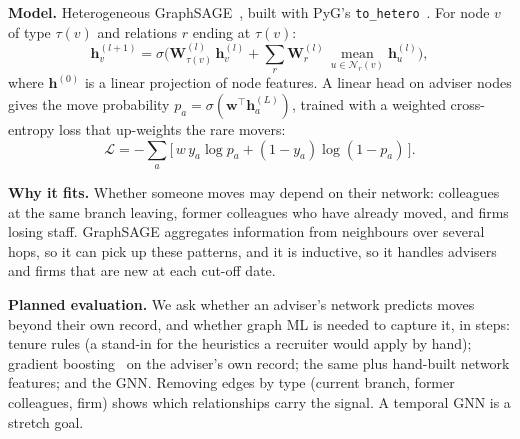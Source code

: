 \documentclass{article}
\begin{document}
\textbf{Model.} Heterogeneous GraphSAGE~\citep{hamilton2017graphsage}, built with PyG's \texttt{to\_hetero}~\citep{fey2019pyg}. For node $v$ of type $\tau(v)$ and relations $r$ ending at $\tau(v)$:
\begin{equation}
  \mathbf{h}_v^{(l+1)} = \sigma\Big( \mathbf{W}^{(l)}_{\tau(v)}\,\mathbf{h}_v^{(l)} + \sum_{r} \mathbf{W}^{(l)}_{r}\, \operatorname*{mean}_{u \in \mathcal{N}_r(v)} \mathbf{h}_u^{(l)} \Big),
\end{equation}
where $\mathbf{h}^{(0)}$ is a linear projection of node features. A linear head on adviser nodes gives the move probability $p_a = \sigma(\mathbf{w}^{\top}\mathbf{h}_a^{(L)})$, trained with a weighted cross-entropy loss that up-weights the rare movers:
\begin{equation}
  \mathcal{L} = -\sum_{a} \big[\, w\, y_a \log p_a + (1-y_a)\log(1-p_a) \,\big].
\end{equation}

\textbf{Why it fits.} Whether someone moves may depend on their network: colleagues at the same branch leaving, former colleagues who have already moved, and firms losing staff. GraphSAGE aggregates information from neighbours over several hops, so it can pick up these patterns, and it is inductive, so it handles advisers and firms that are new at each cut-off date.

\textbf{Planned evaluation.} We ask whether an adviser's network predicts moves beyond their own record, and whether graph ML is needed to capture it, in steps: tenure rules (a stand-in for the heuristics a recruiter would apply by hand); gradient boosting~\citep{ke2017lightgbm} on the adviser's own record; the same plus hand-built network features; and the GNN. Removing edges by type (current branch, former colleagues, firm) shows which relationships carry the signal. A temporal GNN is a stretch goal.

{\small


}
\end{document}

